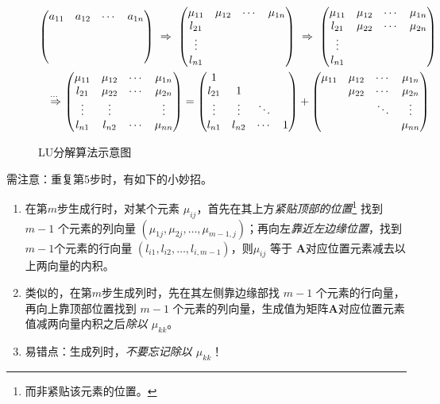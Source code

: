 \begin{figure}[htbp]
\small\centering
\begin{gather*}
    \begin{pmatrix}a_{11}&a_{12}&\cdots&a_{1n}\\&&&\\&&&\\&&&\end{pmatrix}\ \Rightarrow\ 
    \begin{pmatrix}\mu_{11}&\mu_{12}&\cdots&\mu_{1n}\\l_{21}&&&\\\vdots&&&\\l_{n1}&&&\end{pmatrix}\ \Rightarrow\ 
    \begin{pmatrix}\mu_{11}&\mu_{12}&\cdots&\mu_{1n}\\l_{21}&\mu_{22}&\cdots&\mu_{2n}\\\vdots&&&\\l_{n1}&&&\end{pmatrix}\\
    \ \overset{\cdots\ }{\Rightarrow}
    \begin{pmatrix}\mu_{11}&\mu_{12}&\cdots&\mu_{1n}\\l_{21}&\mu_{22}&\cdots&\mu_{2n}\\\vdots&\vdots&&\vdots\\l_{n1}&l_{n2}&\cdots&\mu_{nn}\end{pmatrix}=
    \begin{pmatrix}1&&&\\l_{21}&1&&\\\vdots&\vdots&\ddots&\\l_{n1}&l_{n2}&\cdots&1\end{pmatrix}+
    \begin{pmatrix}\mu_{11}&\mu_{12}&\cdots&\mu_{1n}\\&\mu_{22}&\cdots&\mu_{2n}\\&&\ddots&\vdots\\&&&\mu_{nn}\end{pmatrix}
\end{gather*}
\caption{LU分解算法示意图}
\end{figure}

\entry 需注意：重复第5步时，有如下的小妙招。
\begin{enumerate}\tl
    \item 在第$m$步生成行时，对某个元素 $\mu_{ij}$，首先在其上方\emph{紧贴顶部的位置}\footnote{而非紧贴该元素的位置。} 找到 $m-1$ 个元素的列向量 $(\mu_{1j},\mu_{2j},\ldots,\mu_{m-1,j})$；再向左\emph{靠近左边缘位置}，找到$m-1$个元素的行向量 $(l_{i1},l_{i2},\ldots,l_{i,m-1})$，则$\mu_{ij}$ 等于 $\mathbf{A}$对应位置元素减去以上两向量的内积。
    \item 类似的，在第$m$步生成列时，先在其左侧靠边缘部找 $m-1$ 个元素的行向量，再向上靠顶部位置找到 $m-1$ 个元素的列向量，生成值为矩阵$\mathbf{A}$对应位置元素值减两向量内积之后\emph{除以 $\mu_{kk}$}。
    \item 易错点：生成列时，\emph{不要忘记除以 $\mu_{kk}$}！
\end{enumerate}

